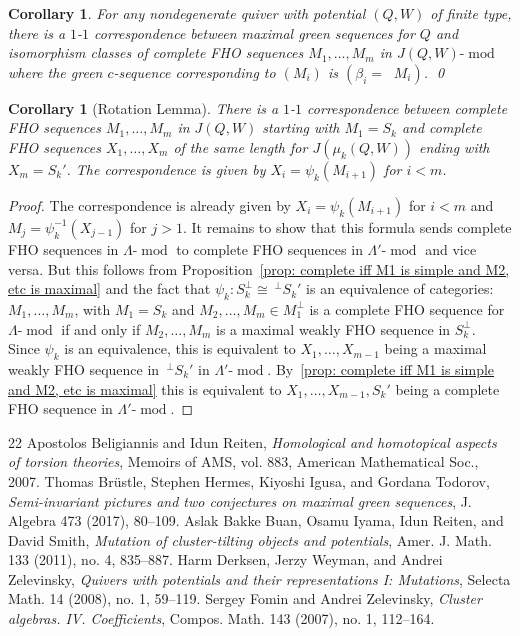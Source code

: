 \documentclass[10pt]{amsart}
\newtheorem{coro}[theo]{Corollary}
\theoremstyle{definition}
\DeclareMathOperator{\undim}{\underline{dim}}
\DeclareMathOperator{\modr}{mod}
\begin{document}
\begin{coro}\label{cor: main thm of section 2}
For any nondegenerate quiver with potential $(Q,W)$ of finite type, there is a $1$-$1$ correspondence between maximal green sequences for $Q$ and isomorphism classes of complete FHO sequences $M_1,\ldots,M_m$ in $J(Q,W)\text{-}\modr $ where the green $c$-sequence corresponding to $(M_i)$ is $(\beta_i=\undim M_i)$. \qed
\end{coro}

\begin{coro}[Rotation Lemma]\label{cor: rotation lemma}
There is a $1$-$1$ correspondence between complete FHO sequences $M_1,\ldots,M_m$ in $J(Q,W)$ starting with $M_1=S_k$ and complete FHO sequences $X_1,\ldots,X_m$ of the same length for $J(\mu_k(Q,W))$ ending with $X_m=S_k'$. The correspondence is given by $X_i=\psi_k(M_{i+1})$ for $i<m$.
\end{coro}

\begin{proof} The correspondence is already given by $X_i=\psi_k(M_{i+1})$ for $i<m$ and $M_j=\psi_k^{-1}(X_{j-1})$ for $j>1$. It remains to show that this formula sends complete FHO sequences in $\Lambda\text{-}\modr $ to complete FHO sequences in $\Lambda'\text{-}\modr $ and vice versa. But this follows from Proposition~\ref{prop: complete iff M1 is simple and M2, etc is maximal} and the fact that $\psi_k:S_k^\perp\cong \,^\perp S_k'$ is an equivalence of categories: $M_1,\ldots,M_m$, with $M_1=S_k$ and $M_2,\ldots,M_m\in M_1^\perp$ is a complete FHO sequence for $\Lambda\text{-}\modr $ if and only if $M_2,\ldots,M_m$ is a maximal weakly FHO sequence in $S_k^\perp$. Since $\psi_k$ is an equivalence, this is equivalent to $X_1,\ldots,X_{m-1}$ being a maximal weakly FHO sequence in $\,^\perp S_k'$ in $\Lambda'\text{-}\modr $. By~\ref{prop: complete iff M1 is simple and M2, etc is maximal} this is equivalent to $X_1,\ldots,X_{m-1},S_k'$ being a complete FHO sequence in $\Lambda'\text{-}\modr $.
\end{proof}
\begin{thebibliography}{22}
 Apostolos Beligiannis and Idun Reiten, \emph{Homological and homotopical aspects of torsion theories}, Memoirs of AMS, vol. 883, American Mathematical Soc., 2007.
 Thomas Br\"ustle, Stephen Hermes, Kiyoshi Igusa, and Gordana Todorov, \emph{Semi-invariant pictures and two conjectures on maximal green sequences}, J. Algebra 473 (2017), 80--109.
 Aslak Bakke Buan, Osamu Iyama, Idun Reiten, and David Smith, \emph{Mutation of cluster-tilting objects and potentials}, Amer. J. Math. 133 (2011), no. 4, 835--887.
 Harm Derksen, Jerzy Weyman, and Andrei Zelevinsky, \emph{Quivers with potentials and their representations I: Mutations}, Selecta Math. 14 (2008), no. 1, 59--119.
 Sergey Fomin and Andrei Zelevinsky, \emph{Cluster algebras. IV. Coefficients}, Compos. Math. 143 (2007), no. 1, 112--164.
\end{thebibliography}
\end{document}

